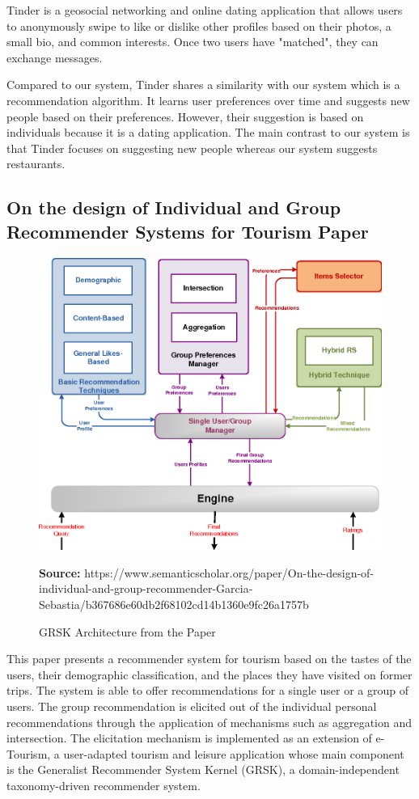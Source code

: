 \documentclass[12pt,oneside,openright,a4paper]{cpe-english-project}
\newcommand*{\captionsource}[2]{%
  \caption[{#1}]{#1}\vspace{-8pt}
  \textbf{Source:} #2}
\begin{document}
Tinder is a geosocial networking and online dating application that allows users to anonymously swipe to like or dislike other profiles based on their photos, a small bio, and common interests. Once two users have "matched", they can exchange messages. \cite{Tinderapp}

Compared to our system, Tinder shares a similarity with our system which is a recommendation algorithm. It learns user preferences over time and suggests new people based on their preferences. However, their suggestion is based on individuals because it is a dating application.  The main contrast to our system is that Tinder focuses on suggesting new people whereas our system suggests restaurants.

\newpage
\subsection{On the design of Individual and Group Recommender Systems for Tourism Paper}

\begin{figure}[!h]\centering
\includegraphics[width=400pt]{./images/2grsk.png}
\label{fig:2grsk}
\captionsource{GRSK Architecture from the Paper}{https://www.semanticscholar.org/paper/On-the-design-of-individual-and-group-recommender-Garcia-Sebastia/b367686e60db2f68102cd14b1360e9fc26a1757b}
\end{figure}

This paper presents a recommender system for tourism based on the tastes of the users, their demographic classification, and the places they have visited on former trips. The system is able to offer recommendations for a single user or a group of users. The group recommendation is elicited out of the individual personal recommendations through the application of mechanisms such as aggregation and intersection. The elicitation mechanism is implemented as an extension of e-Tourism, a user-adapted tourism and leisure application whose main component is the Generalist Recommender System Kernel (GRSK), a domain-independent taxonomy-driven recommender system. \cite{ExpertSystemsWithApplications}
\end{document}
